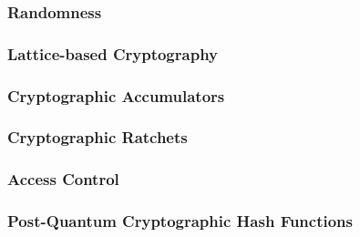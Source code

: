 \subsubsection{Randomness}\label{future_sec:randomness}
\subsubsection{Lattice-based Cryptography}\label{future_sec:lattice_based_cryptography}
\subsubsection{Cryptographic Accumulators}\label{future_sec:cryptographic_accumulators}
\subsubsection{Cryptographic Ratchets}\label{future_sec:cryptographic_ratchets}
\subsubsection{Access Control}\label{future_sec:access_control}
\subsubsection{Post-Quantum Cryptographic Hash Functions}\label{future_sec:hash_functions:cryptographic_hash_function:post_quantum}

\vspace{-1.5mm}
\newpage
